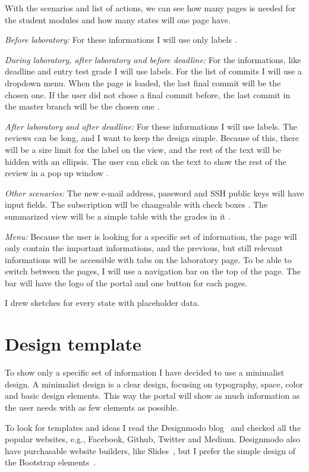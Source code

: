 With the scenarios and list of actions, we can see how many pages is needed for the student modules and how many states will one page have. 

\emph{Before laboratory:} For these informations I will use only labels .

\emph{During laboratory, after laboratory and before deadline:} For the informations, like deadline and entry test grade I will use labels. For the list of commits I will use a dropdown menu. When the page is loaded, the last final commit will be the chosen one. If the user did not chose a final commit before, the last commit in the master branch will be the chosen one .

\emph{After laboratory and after deadline:} For these informations I will use labels. The reviews can be long, and I want to keep the design simple. Because of this, there will be a size limit for the label on the view, and the rest of the text will be hidden with an ellipsis. The user can click on the text to show the rest of the review in a pop up window .

\emph{Other scenarios:} The new e-mail address, password and SSH public keys will have input fields. The subscription will be changeable with check boxes . The summarized view will be a simple table with the grades in it .

\emph{Menu:} Because the user is looking for a specific set of information, the page will only contain the important informations, and the previous, but still relevant informations will be accessible with tabs on the laboratory page. To be able to switch between the pages, I will use a navigation bar on the top of the page. The bar will have the logo of the portal and one button for each pages.

I drew sketches  for every state with placeholder data. 

\section{Design template}

To show only a specific set of information I have decided to use a minimalist design. A minimalist design is a clear design, focusing on typography, space, color and basic design elements. This way the portal will show as much information as the user needs with as few elements as possible. 

To look for templates and ideas I read the Designmodo blog~\cite{Designmodo} and checked all the popular websites, e.g., Facebook, Github, Twitter and Medium. Designmodo also have purchasable website builders, like Slides~\cite{Designmodo-slides}, but I prefer the simple design of the Bootstrap elements~\cite{Bootstrap}. 

